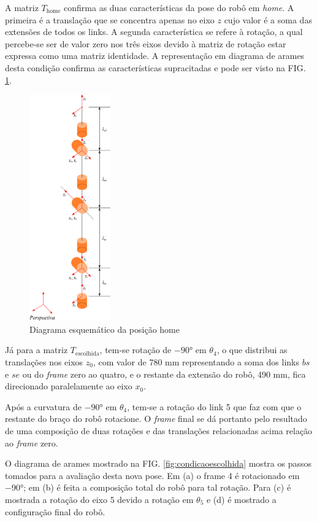 A matriz $T_\mathrm{home}$ confirma as duas características da pose do robô em \textit{home}. A primeira é a translação que se concentra apenas no eixo $z$ cujo valor é a soma das extensões de todos os links. A segunda característica se refere à rotação, a qual percebe-se ser de valor zero nos três eixos devido à matriz de rotação estar expressa como uma matriz identidade. A representação em diagrama de arames desta condição confirma as características supracitadas e pode ser visto na FIG. \ref{diagramahome}.
\begin{figure}[h]
    \centering
    \includegraphics[width=3.5cm]{Imagem/validacao_home.eps}
    \caption{Diagrama esquemático da posição home}
    \label{diagramahome}
\end{figure}

Já para a matriz $T_\mathrm{escolhida}$, tem-se rotação de $-\ang{90}$ em $\theta_4$, o que distribui as translações nos eixos $z_0$, com valor de 780 mm representando a soma dos links $bs$ e $se$ ou do \textit{frame} zero ao quatro, e o restante da extensão do robô, 490 mm, fica direcionado paralelamente ao eixo $x_0$.

Após a curvatura de $-\ang{90}$ em $\theta_4$, tem-se a rotação do link 5 que faz com que o restante do braço do robô rotacione. O \textit{frame} final se dá portanto pelo resultado de uma composição de duas rotações e das translações relacionadas acima relação ao \textit{frame} zero.

O diagrama de arames mostrado na FIG. \ref{fig:condicaoescolhida} mostra os passos tomados para a avaliação desta nova pose. Em (a) o frame 4 é rotacionado em $-\ang{90}$; em (b) é feita a composição total do robô para tal rotação. Para (c) é mostrada a rotação do eixo 5 devido a rotação em $\theta_5$ e (d) é mostrado a configuração final do robô.

